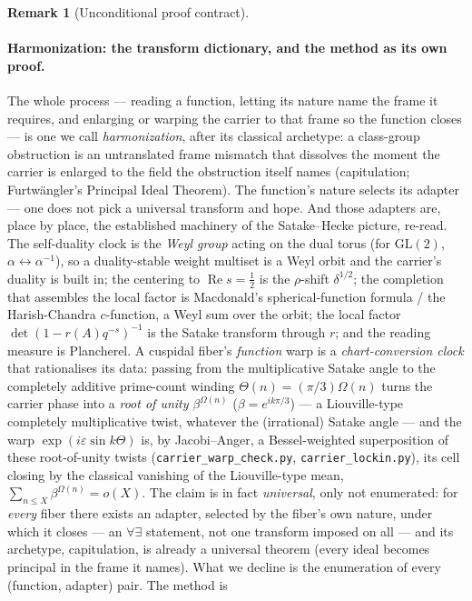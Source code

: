 \documentclass[11pt]{article}
\theoremstyle{definition}
\newtheorem{remark}[theorem]{Remark}
\renewcommand{\Re}{\operatorname{Re}}
\begin{document}
\begin{remark}[Unconditional proof contract]
\begin{enumerate}
\paragraph{Harmonization: the transform dictionary, and the method as its own proof.} The whole process ---
reading a function, letting its nature name the frame it requires, and enlarging or warping the carrier to
that frame so the function closes --- is one we call \emph{harmonization}, after its classical archetype: a
class-group obstruction is an untranslated frame mismatch that dissolves the moment the carrier is enlarged
to the field the obstruction itself names (capitulation; Furtw\"angler's Principal Ideal Theorem). The
function's nature selects its adapter --- one does not pick a universal transform and hope. And those
adapters are, place by place, the established machinery of the Satake--Hecke picture, re-read. The
self-duality clock
is the \emph{Weyl group} acting on the dual torus (for $\mathrm{GL}(2)$, $\alpha\leftrightarrow\alpha^{-1}$),
so a duality-stable weight multiset is a Weyl orbit and the carrier's duality is built in; the centering to
$\Re s=\tfrac12$ is the $\rho$-shift $\delta^{1/2}$; the completion that assembles the local factor is
Macdonald's spherical-function formula / the Harish-Chandra $c$-function, a Weyl sum over the orbit; the
local factor $\det(1-r(A)q^{-s})^{-1}$ is the Satake transform through $r$; and the reading measure is
Plancherel. A cuspidal fiber's \emph{function} warp is a \emph{chart-conversion clock} that rationalises its
data: passing from the multiplicative Satake angle to the completely additive prime-count winding
$\Theta(n)=(\pi/3)\Omega(n)$ turns the carrier phase into a \emph{root of unity} $\beta^{\Omega(n)}$
($\beta=e^{ik\pi/3}$) --- a Liouville-type completely multiplicative twist, whatever the (irrational) Satake
angle --- and the warp $\exp(i\varepsilon\sin k\Theta)$ is, by Jacobi--Anger, a Bessel-weighted superposition
of these root-of-unity twists (\texttt{carrier\_warp\_check.py}, \texttt{carrier\_lockin.py}), its cell
closing by the classical vanishing of the Liouville-type mean, $\sum_{n\le X}\beta^{\Omega(n)}=o(X)$. The claim is in fact
\emph{universal}, only not enumerated: for \emph{every} fiber there exists an adapter, selected by the
fiber's own nature, under which it closes --- an $\forall\exists$ statement, not one transform imposed on
all --- and its archetype, capitulation, is already a universal theorem (every ideal becomes principal in
the frame it names). What we decline is the enumeration of every (function, adapter) pair. The method is

\end{enumerate}
\end{remark}
\end{document}
